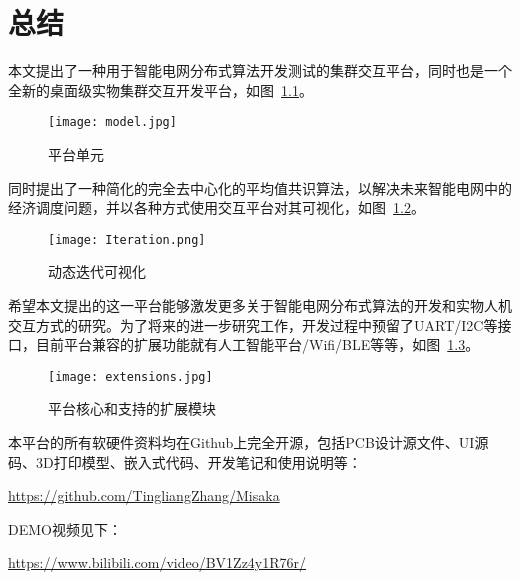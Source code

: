 \chapter{总结}
\label{cha:Conclusion}

本文提出了一种用于智能电网分布式算法开发测试的集群交互平台，同时也是一个全新的桌面级实物集群交互开发平台，如图~\ref{fig:model}。

\begin{figure}[htbp]
    \centering
    \texttt{[image: model.jpg]}
    \caption{平台单元}
    \label{fig:model}
\end{figure}

同时提出了一种简化的完全去中心化的平均值共识算法，以解决未来智能电网中的经济调度问题，并以各种方式使用交互平台对其可视化，如图~\ref{fig:iteration}。

\begin{figure}[htbp]
    \centering
    \texttt{[image: Iteration.png]}
    \caption{动态迭代可视化}
    \label{fig:iteration}
\end{figure}

希望本文提出的这一平台能够激发更多关于智能电网分布式算法的开发和实物人机交互方式的研究。为了将来的进一步研究工作，开发过程中预留了UART/I2C等接口，目前平台兼容的扩展功能就有人工智能平台/Wifi/BLE等等，如图~\ref{fig:extension}。

\begin{figure}[htbp]
    \centering
    \texttt{[image: extensions.jpg]}
    \caption{平台核心和支持的扩展模块}
    \label{fig:extension}
\end{figure}

本平台的所有软硬件资料均在Github上完全开源，包括PCB设计源文件、UI源码、3D打印模型、嵌入式代码、开发笔记和使用说明等：

\url{https://github.com/TingliangZhang/Misaka}

DEMO视频见下：

\url{https://www.bilibili.com/video/BV1Zz4y1R76r/}